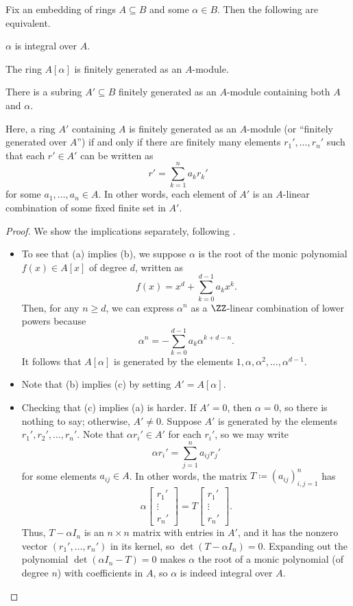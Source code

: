 \documentclass[../notes.tex]{subfiles}
\begin{document}
\begin{proposition} \label{prop:how-to-integral}
	Fix an embedding of rings $A\subseteq B$ and some $\alpha\in B$. Then the following are equivalent.
	\begin{listalph}
		\item $\alpha$ is integral over $A$.
		\item The ring $A[\alpha]$ is finitely generated as an $A$-module.
		\item There is a subring $A'\subseteq B$ finitely generated as an $A$-module containing both $A$ and $\alpha$.
	\end{listalph}
\end{proposition}
Here, a ring $A'$ containing $A$ is finitely generated as an $A$-module (or ``finitely generated over $A$'') if and only if there are finitely many elements $r_1',\ldots,r_n'$ such that each $r'\in A'$ can be written as
\[r'=\sum_{k=1}^na_kr_k'\]
for some $a_1,\ldots,a_n\in A$. In other words, each element of $A'$ is an $A$-linear combination of some fixed finite set in $A'$.
\begin{proof}
	We show the implications separately, following .
	\begin{itemize}
		\item To see that (a) implies (b), we suppose $\alpha$ is the root of the monic polynomial $f(x)\in A[x]$ of degree $d$, written as
		\[f(x)=x^d+\sum_{k=0}^{d-1}a_kx^k.\]
		Then, for any $n\ge d$, we can express $\alpha^n$ as a $\ZZ$-linear combination of lower powers because
		\[\alpha^n=-\sum_{k=0}^{d-1}a_k\alpha^{k+d-n}.\]
		It follows that $A[\alpha]$ is generated by the elements $1,\alpha,\alpha^2,\ldots,\alpha^{d-1}$.
		\item Note that (b) implies (c) by setting $A'=A[\alpha]$.
		\item Checking that (c) implies (a) is harder. If $A'=0$, then $\alpha=0$, so there is nothing to say; otherwise, $A'\ne0$. Suppose $A'$ is generated by the elements $r_1',r_2',\ldots,r_n'$. Note that $\alpha r_i'\in A'$ for each $r_i'$, so we may write
		\[\alpha r_i'=\sum_{j=1}^na_{ij}r_j'\]
		for some elements $a_{ij}\in A$. In other words, the matrix $T\coloneqq(a_{ij})_{i,j=1}^n$ has
		\[\alpha\begin{bmatrix}
			r_1' \\
			\vdots \\
			r_n'
		\end{bmatrix}=T\begin{bmatrix}
			r_1' \\
			\vdots \\
			r_n'
		\end{bmatrix}.\]
		Thus, $T-\alpha I_n$ is an $n\times n$ matrix with entries in $A'$, and it has the nonzero vector $(r_1',\ldots,r_n')$ in its kernel, so $\det(T-\alpha I_n)=0$. Expanding out the polynomial $\det(\alpha I_n-T)=0$ makes $\alpha$ the root of a monic polynomial (of degree $n$) with coefficients in $A$, so $\alpha$ is indeed integral over $A$.
		\qedhere
	\end{itemize}
\end{proof}
\end{document}
